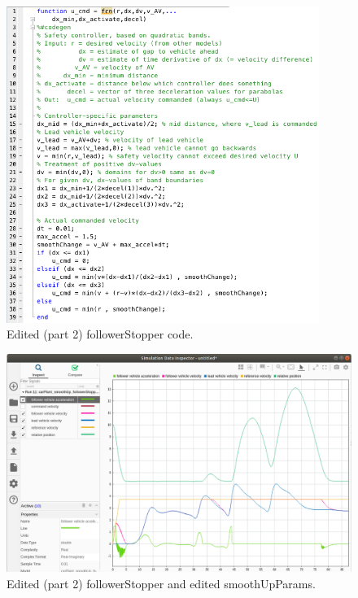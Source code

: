 \documentclass[12pt, letterpaper]{article}
\begin{document}
\begin{figure}[h]
\begin{center}
\includegraphics[width=4in]{EDITED2_followerStopper}
\caption{Edited (part 2) followerStopper code.}
\label{default}
\end{center}
\end{figure}

\begin{figure}[h!]
\begin{center}
\includegraphics[width=6in]{edited2FS_editedSUP_1}
\caption{Edited (part 2) followerStopper and edited smoothUpParams.}
\label{default}
\end{center}
\end{figure}

\end{document}

